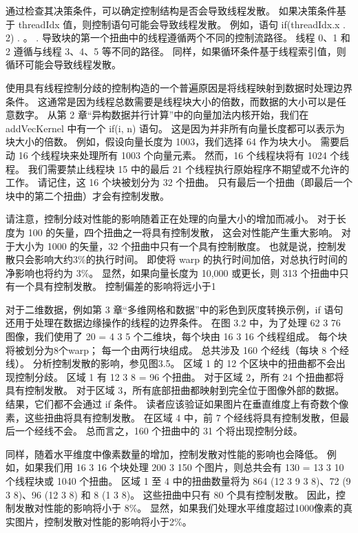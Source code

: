 通过检查其决策条件，可以确定控制结构是否会导致线程发散。 如果决策条件基于 threadIdx 值，则控制语句可能会导致线程发散。 
例如，语句 if(threadIdx.x . 2) {. 。 .} 导致块的第一个扭曲中的线程遵循两个不同的控制流路径。 
线程 0、1 和 2 遵循与线程 3、4、5 等不同的路径。 同样，如果循环条件基于线程索引值，则循环可能会导致线程发散。

使用具有线程控制分歧的控制构造的一个普遍原因是将线程映射到数据时处理边界条件。 
这通常是因为线程总数需要是线程块大小的倍数，而数据的大小可以是任意数字。 
从第 2 章“异构数据并行计算”中的向量加法内核开始，我们在 addVecKernel 中有一个 if(i, n) 语句。 
这是因为并非所有向量长度都可以表示为块大小的倍数。 例如，假设向量长度为 1003，我们选择 64 作为块大小。 
需要启动 16 个线程块来处理所有 1003 个向量元素。 然而，16 个线程块将有 1024 个线程。 
我们需要禁止线程块 15 中的最后 21 个线程执行原始程序不期望或不允许的工作。 
请记住，这 16 个块被划分为 32 个扭曲。 只有最后一个扭曲（即最后一个块中的第二个扭曲）才会有控制发散。

请注意，控制分歧对性能的影响随着正在处理的向量大小的增加而减小。 对于长度为 100 的矢量，四个扭曲之一将具有控制发散，
这会对性能产生重大影响。 对于大小为 1000 的矢量，32 个扭曲中只有一个具有控制散度。 
也就是说，控制发散只会影响大约3\%的执行时间。 即使将 warp 的执行时间加倍，对总执行时间的净影响也将约为 3\%。 
显然，如果向量长度为 10,000 或更长，则 313 个扭曲中只有一个具有控制发散。 控制偏差的影响将远小于1%

对于二维数据，例如第 3 章“多维网格和数据”中的彩色到灰度转换示例，if 语句还用于处理在数据边缘操作的线程的边界条件。 
在图 3.2 中，为了处理 62 3 76 图像，我们使用了 20 = 4 3 5 个二维块，每个块由 16 3 16 个线程组成。 
每个块将被划分为8个warp； 每一个由两行块组成。 总共涉及 160 个经线（每块 8 个经线）。 分析控制发散的影响，参见图3.5。 
区域 1 的 12 个区块中的扭曲都不会出现控制分歧。 区域 1 有 12 3 8 = 96 个扭曲。
对于区域 2，所有 24 个扭曲都将具有控制发散。 对于区域 3，所有底部扭曲都映射到完全位于图像外部的数据。 
结果，它们都不会通过 if 条件。 读者应该验证如果图片在垂直维度上有奇数个像素，这些扭曲将具有控制发散。 
在区域 4 中，前 7 个经线将具有控制发散，但最后一个经线不会。 总而言之，160 个扭曲中的 31 个将出现控制分歧。

同样，随着水平维度中像素数量的增加，控制发散对性能的影响也会降低。 
例如，如果我们用 16 3 16 个块处理 200 3 150 个图片，则总共会有 130 = 13 3 10 个线程块或 1040 个扭曲。 
区域 1 至 4 中的扭曲数量将为 864 (12 3 9 3 8)、72 (9 3 8)、96 (12 3 8) 和 8 (1 3 8)。 
这些扭曲中只有 80 个具有控制发散。 因此，控制发散对性能的影响将小于 8\%。 
显然，如果我们处理水平维度超过1000像素的真实图片，控制发散对性能的影响将小于2\%。

